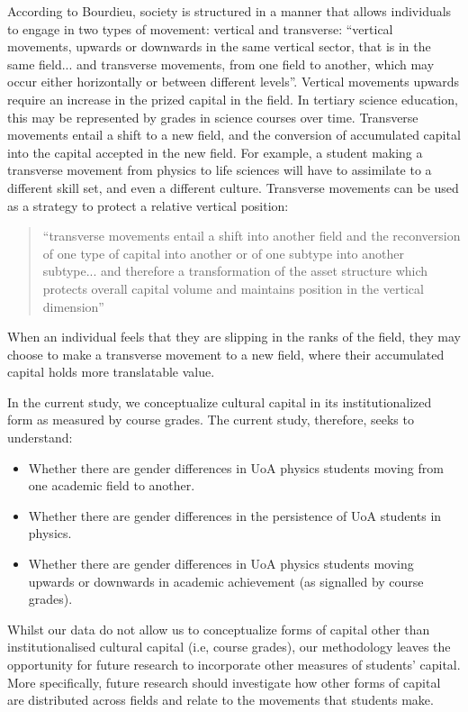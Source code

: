 According to Bourdieu, society is structured in a manner that allows individuals to engage in two types of movement: vertical and transverse: ``vertical movements, upwards or downwards in the same vertical sector, that is in the same field... and transverse movements, from one field to another, which may occur either horizontally or between different levels''.\cite{Bourdieu1984} Vertical movements upwards require an increase in the prized capital in the field. In tertiary science education, this may be represented by grades in science courses over time. Transverse movements entail a shift to a new field, and the conversion of accumulated capital into the capital accepted in the new field. For example, a student making a transverse movement from physics to life sciences will have to assimilate to a different skill set, and even a different culture. Transverse movements can be used as a strategy to protect a relative vertical position: 
\begin{quote}
    ``transverse movements entail a shift into another field and the reconversion of one type of capital into another or of one subtype into another subtype... and therefore a transformation of the asset structure which protects overall capital volume and maintains position in the vertical dimension''\cite{Bourdieu1984}
\end{quote} When an individual feels that they are slipping in the ranks of the field, they may choose to make a transverse movement to a new field, where their accumulated capital holds more translatable value. 

In the current study, we conceptualize cultural capital in its institutionalized form as measured by course grades. The current study, therefore, seeks to understand:
\begin{itemize}
    \item Whether there are gender differences in UoA physics students moving from one academic field to another.
    \item Whether there are gender differences in the persistence of UoA students in physics.
    \item Whether there are gender differences in UoA physics students moving upwards or downwards in academic achievement (as signalled by course grades).
\end{itemize}

Whilst our data do not allow us to conceptualize forms of capital other than institutionalised cultural capital (i.e, course grades), our methodology leaves the opportunity for future research to incorporate other measures of students' capital. More specifically, future research should investigate how other forms of capital are distributed across fields and relate to the movements that students make. 

